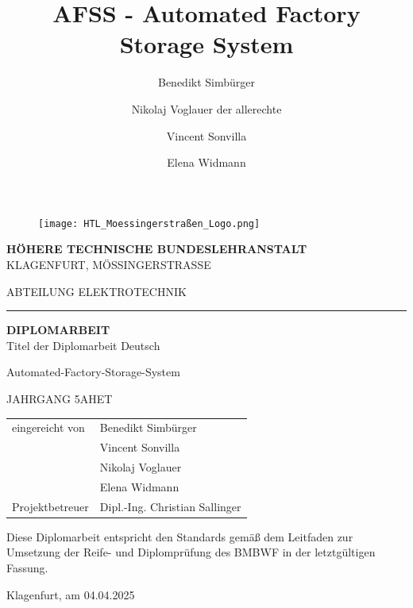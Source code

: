 \documentclass{article}
\title{AFSS - Automated Factory Storage System}
\author{Benedikt Simbürger \\
    \and Nikolaj Voglauer der allerechte \\
    \and Vincent Sonvilla \\
    \and Elena Widmann
    }
\begin{document}

\begin{figure}[h]
    \texttt{[image: HTL\_Moessingerstraßen\_Logo.png]}
    \centering
\end{figure}

\begin{center}
    \huge \textbf{HÖHERE TECHNISCHE BUNDESLEHRANSTALT} \\
    \vspace{5mm}
    \Large{KLAGENFURT, MÖSSINGERSTRASSE}

\end{center}

\vspace{7mm}

\begin{center}
    \Large{ABTEILUNG ELEKTROTECHNIK}
\end{center}

\hrule

\vspace{10mm}

\begin{center}
    \Huge \textbf{DIPLOMARBEIT} \\
    \vspace{7mm}
    \huge{Titel der Diplomarbeit Deutsch}

    \vspace{7mm}
    \huge{Automated-Factory-Storage-System}

    \vspace{7mm}
    \Large{JAHRGANG 5AHET}

\end{center}

\vspace{20mm}

\begin{flushleft}
    \bgroup
        \Large
        \def\arraystretch{1.5}
        \begin{tabular}{p{5cm}l}
            eingereicht von & Benedikt Simbürger\\
            & Vincent Sonvilla\\
            & Nikolaj Voglauer\\
            & Elena Widmann\\
            Projektbetreuer & Dipl.-Ing. Christian Sallinger
        \end{tabular}
    \egroup
\end{flushleft}

\vspace{7mm}
\Large
Diese Diplomarbeit entspricht den Standards gemäß dem Leitfaden zur Umsetzung der Reife- und Diplomprüfung des BMBWF in der letztgültigen Fassung.\par
\begin{flushright}
    Klagenfurt, am 04.04.2025
\end{flushright}
\end{document}
